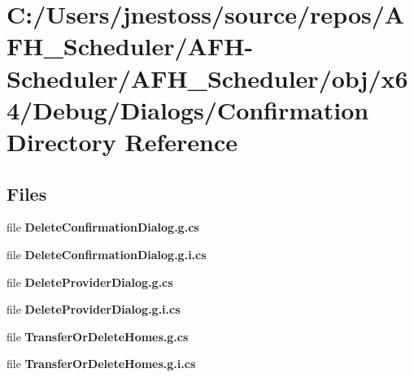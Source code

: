 \section{C\+:/\+Users/jnestoss/source/repos/\+A\+F\+H\+\_\+\+Scheduler/\+A\+F\+H-\/\+Scheduler/\+A\+F\+H\+\_\+\+Scheduler/obj/x64/\+Debug/\+Dialogs/\+Confirmation Directory Reference}
\label{dir_8d53898e2fc6e010f1615a0c93290c65}
\subsection*{Files}
\begin{DoxyCompactItemize}
\item 
file \textbf{ Delete\+Confirmation\+Dialog.\+g.\+cs}
\item 
file \textbf{ Delete\+Confirmation\+Dialog.\+g.\+i.\+cs}
\item 
file \textbf{ Delete\+Provider\+Dialog.\+g.\+cs}
\item 
file \textbf{ Delete\+Provider\+Dialog.\+g.\+i.\+cs}
\item 
file \textbf{ Transfer\+Or\+Delete\+Homes.\+g.\+cs}
\item 
file \textbf{ Transfer\+Or\+Delete\+Homes.\+g.\+i.\+cs}
\end{DoxyCompactItemize}
